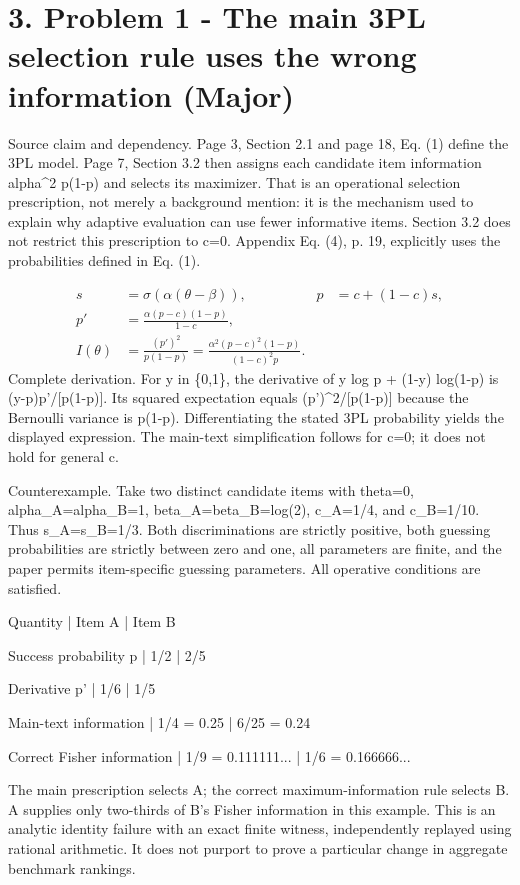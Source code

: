 \documentclass[10pt]{article}
\begin{document}
\section*{3. Problem 1 - The main 3PL selection rule uses the wrong information (Major)}
Source claim and dependency. Page 3, Section 2.1 and page 18, Eq. (1) define the 3PL model. Page 7, Section 3.2 then assigns each candidate item information alpha\textasciicircum{}2 p(1-p) and selects its maximizer. That is an operational selection prescription, not merely a background mention: it is the mechanism used to explain why adaptive evaluation can use fewer informative items. Section 3.2 does not restrict this prescription to c=0. Appendix Eq. (4), p. 19, explicitly uses the probabilities defined in Eq. (1).\par
\[\begin{aligned}s&=\sigma(\alpha(\theta-\beta)), & p&=c+(1-c)s,\\p'&=\frac{\alpha(p-c)(1-p)}{1-c},\\ I(\theta)&=\frac{(p')^2}{p(1-p)}=\frac{\alpha^2(p-c)^2(1-p)}{(1-c)^2p}.\end{aligned}\] Complete derivation. For y in \{0,1\}, the derivative of y log p + (1-y) log(1-p) is (y-p)p’/[p(1-p)]. Its squared expectation equals (p’)\textasciicircum{}2/[p(1-p)] because the Bernoulli variance is p(1-p). Differentiating the stated 3PL probability yields the displayed expression. The main-text simplification follows for c=0; it does not hold for general c.\par
Counterexample. Take two distinct candidate items with theta=0, alpha\_A=alpha\_B=1, beta\_A=beta\_B=log(2), c\_A=1/4, and c\_B=1/10. Thus s\_A=s\_B=1/3. Both discriminations are strictly positive, both guessing probabilities are strictly between zero and one, all parameters are finite, and the paper permits item-specific guessing parameters. All operative conditions are satisfied.\par
Quantity | Item A | Item B\par
Success probability p | 1/2 | 2/5\par
Derivative p’ | 1/6 | 1/5\par
Main-text information | 1/4 = 0.25 | 6/25 = 0.24\par
Correct Fisher information | 1/9 = 0.111111... | 1/6 = 0.166666...\par
The main prescription selects A; the correct maximum-information rule selects B. A supplies only two-thirds of B’s Fisher information in this example. This is an analytic identity failure with an exact finite witness, independently replayed using rational arithmetic. It does not purport to prove a particular change in aggregate benchmark rankings.\par
\end{document}
